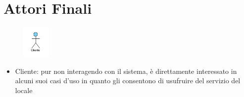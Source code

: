 \section{Attori Finali}
\begin{figure}[H]
	\centering
	\includegraphics[width=0.12\textwidth]{Immagini/AttoriFinali.png}
\end{figure}

\begin{itemize}
	\item Cliente: pur non interagendo con il sistema, è direttamente interessato in alcuni suoi casi d'uso in quanto gli consentono di usufruire del servizio del locale
\end{itemize}
\newpage

